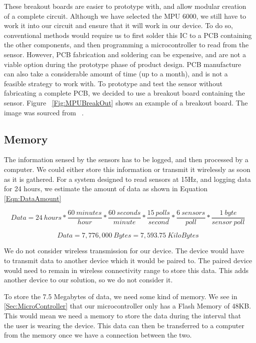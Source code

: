 These breakout boards are easier to prototype with, and allow modular creation of a complete circuit. Although we have selected the MPU 6000, we still have to work it into our circuit and ensure that it will work in our device. To do so, conventional methods would require us to first solder this IC to a PCB containing the other components, and then programming a microcontroller to read from the sensor. However, PCB fabrication and soldering can be expensive, and are not a viable option during the prototype phase of product design. PCB manufacture can also take a considerable amount of time (up to a month), and is not a feasible strategy to work with. To prototype and test the sensor without fabricating a complete PCB, we decided to use a breakout board containing the sensor. Figure ~\ref{Fig:MPUBreakOut} shows an example of a breakout board. The image was sourced from ~\cite{Web:SFBreakout}.

\subsection{Memory}
\label{Sec:Memory}

The information sensed by the sensors has to be logged, and then processed by a computer. We could either store this information or transmit it wirelessly as soon as it is gathered. For a system designed to read sensors at 15Hz, and logging data for 24 hours, we estimate the amount of data as shown in Equation \ref{Eqn:DataAmount}

\begin{equation}
\label{Eqn:DataAmount}
Data = 24~hours * \dfrac{60~minutes}{hour} * \dfrac{60~seconds}{minute} * \dfrac{15~polls}{second} * \dfrac{6~sensors}{poll} * \dfrac{1~byte}{sensor~poll}
\end{equation}

\begin{equation}
\label{Eqn:DataAmount2}
Data = 7,776,000~Bytes = 7,593.75~KiloBytes
\end{equation}

We do not consider wireless transmission for our device. The device would have to transmit data to another device which it would be paired to. The paired device would need to remain in wireless connectivity range to store this data. This adds another device to our solution, so we do not consider it. 

To store the 7.5 Megabytes of data, we need some kind of memory. We see in \ref{Sec:MicroController} that our microcontroller only has a Flash Memory of 48KB. This would mean we need a memory to store the data during the interval that the user is wearing the device. This data can then be transferred to a computer from the memory once we have a connection between the two.

